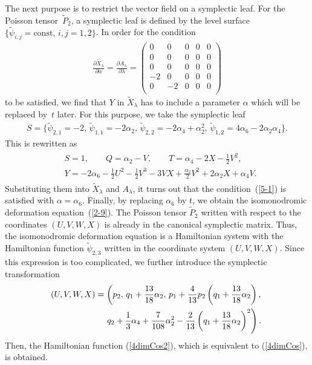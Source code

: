 \documentclass[10pt,a4paper]{amsart}
\numberwithin{equation}{section}
\begin{document}
The next purpose is to restrict the vector f\/ield on a symplectic leaf. For the Poisson tensor~$\widetilde{P}_2$, a symplectic leaf is def\/ined by the level surface $\{ \widetilde{\psi}_{i,j} = \text{const},\, i,j=1,2\}$. In order for the condition
\begin{gather}
\frac{\partial \widetilde{X}_\lambda }{\partial \alpha } = \frac{\partial A_\lambda }{\partial \lambda } =\left(
\begin{matrix}
0 & 0 & 0 & 0 & 0 \\
0 & 0 & 0 & 0 & 0 \\
0 & 0 & 0 & 0 & 0 \\
-2 & 0 & 0 & 0 & 0 \\
0 & -2 & 0 & 0 & 0 \\
\end{matrix}\right)\label{5-1}
\end{gather}
to be satisf\/ied, we f\/ind that $Y$ in $\widetilde{X}_\lambda $ has to include a parameter $\alpha $ which will be replaced by~$t$ later. For this purpose, we take the symplectic leaf
\begin{gather*}
S = \big\{ \widetilde{\psi}_{2,1} = -2,\, \widetilde{\psi}_{1,1} = -2\alpha _2,\,\widetilde{\psi}_{2,2} = -2\alpha _4 + \alpha _2^2,\, \widetilde{\psi}_{1,2} = 4\alpha _6 - 2\alpha _2\alpha _4\big \}.
\end{gather*}
This is rewritten as
\begin{gather*}
\begin{split}
& S = 1,\qquad Q = \alpha _2-V,\qquad T = \alpha _4-2X-\frac{1}{2}V^2, \\
& Y = -2\alpha _6-\frac{1}{2}U^2 - \frac{1}{2}V^3 - 3VX + \frac{\alpha _2}{2}V^2 + 2\alpha _2X + \alpha _4V.
\end{split}
\end{gather*}
Substituting them into $\widetilde{X}_\lambda $ and $A_\lambda $, it turns out that the condition~(\ref{5-1}) is satisf\/ied with $\alpha =\alpha _6$. Finally, by replacing $\alpha _6$ by $t$, we obtain the isomonodromic deformation equation~(\ref{2-9}). The Poisson tensor $\widetilde{P}_2$ written with respect to the coordinates $(U,V,W,X)$ is already in the canonical symplectic matrix. Thus, the isomonodromic deformation equation is a Hamiltonian system with the Hamiltonian function $\widetilde{\psi}_{2,3}$ written in the coordinate system $(U,V,W,X)$. Since this expression is too complicated, we further introduce the symplectic transformation
\begin{gather*}
 (U,V,W,X) = \left(p_2,\, q_1+\frac{13}{18}\alpha _2,\, p_1 + \frac{4}{13}p_2\left(q_1+\frac{13}{18}\alpha _2\right)
,\right.\\
\left.\hphantom{(U,V,W,X) =}{} q_2+\frac{1}{3}\alpha _4 + \frac{7}{108}\alpha _2^2-\frac{2}{13}\left(q_1+\frac{13}{18}\alpha _2\right)^2\right).
\end{gather*}
Then, the Hamiltonian function (\ref{4dimCos2}), which is equivalent to (\ref{4dimCos}), is obtained.
\end{document}
